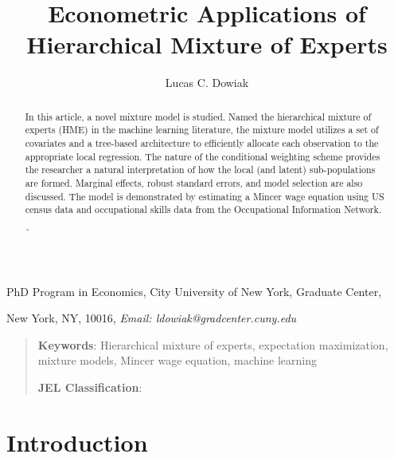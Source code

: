 \documentclass[12pt]{article}
\title{Econometric Applications of Hierarchical Mixture of Experts}
\author{Lucas C. Dowiak}
\theoremstyle{definition}
\begin{document}
 
\maketitle{}


PhD Program in Economics, City University of New York\smallskip, Graduate Center,

New York, NY, 10016, \textit{Email: ldowiak@gradcenter.cuny.edu}

\qquad

\begin{abstract}

In this article, a novel mixture model is studied.
Named the hierarchical mixture of experts (HME) in the machine learning literature,
the mixture model utilizes a set of covariates and a tree-based architecture to
efficiently allocate each observation to the appropriate local regression.
The nature of the conditional weighting scheme provides the researcher a natural
interpretation of how the local (and latent) sub-populations are formed.
Marginal effects, robust standard errors, and model selection are also discussed.
The model is demonstrated by estimating a Mincer wage equation using US census
data and occupational skills data from the Occupational Information Network.
 

ˇ\end{abstract}

\vspace{1pt}

\begin{quotation}
\textbf{Keywords}: Hierarchical mixture of experts, expectation maximization,
mixture models, Mincer wage equation, machine learning

\textbf{JEL Classification}: 
\end{quotation}

\vspace{1pt}

\section{Introduction}
\end{document}
